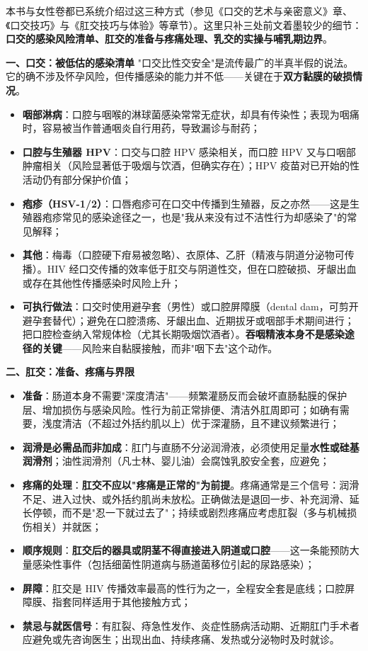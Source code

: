 \documentclass[12pt,UTF8]{ctexbook}
\begin{document}
本书与女性卷都已系统介绍过这三种方式（参见《口交的艺术与亲密意义》章、《口交技巧》与《肛交技巧与体验》等章节）。这里只补三处前文着墨较少的细节：\textbf{口交的感染风险清单、肛交的准备与疼痛处理、乳交的实操与哺乳期边界}。

\textbf{一、口交：被低估的感染清单}
"口交比性交安全"是流传最广的半真半假的说法。它的确不涉及怀孕风险，但传播感染的能力并不低——关键在于\textbf{双方黏膜的破损情况}。
\begin{itemize}
	\item \textbf{咽部淋病}：口腔与咽喉的淋球菌感染常常无症状，却具有传染性；表现为咽痛时，容易被当作普通咽炎自行用药，导致漏诊与耐药；
	\item \textbf{口腔与生殖器 HPV}：口交与口腔 HPV 感染相关，而口腔 HPV 又与口咽部肿瘤相关（风险显著低于吸烟与饮酒，但确实存在）；HPV 疫苗对已开始的性活动仍有部分保护价值；
	\item \textbf{疱疹（HSV-1/2）}：口唇疱疹可在口交中传播到生殖器，反之亦然——这是生殖器疱疹常见的感染途径之一，也是"我从来没有过不洁性行为却感染了"的常见解释；
	\item \textbf{其他}：梅毒（口腔硬下疳易被忽略）、衣原体、乙肝（精液与阴道分泌物可传播）。HIV 经口交传播的效率低于肛交与阴道性交，但在口腔破损、牙龈出血或存在其他性传播感染时风险上升；
	\item \textbf{可执行做法}：口交时使用避孕套（男性）或口腔屏障膜（dental dam，可剪开避孕套替代）；避免在口腔溃疡、牙龈出血、近期拔牙或咽部手术期间进行；把口腔检查纳入常规体检（尤其长期吸烟饮酒者）。\textbf{吞咽精液本身不是感染途径的关键}——风险来自黏膜接触，而非"咽下去"这个动作。
\end{itemize}

\textbf{二、肛交：准备、疼痛与界限}
\begin{itemize}
	\item \textbf{准备}：肠道本身不需要"深度清洁"——频繁灌肠反而会破坏直肠黏膜的保护层、增加损伤与感染风险。性行为前正常排便、清洁外肛周即可；如确有需要，浅度清洁（不超过外括约肌以上）优于深灌肠，且不建议频繁进行；
	\item \textbf{润滑是必需品而非加成}：肛门与直肠不分泌润滑液，必须使用足量\textbf{水性或硅基润滑剂}；油性润滑剂（凡士林、婴儿油）会腐蚀乳胶安全套，应避免；
	\item \textbf{疼痛的处理}：\textbf{肛交不应以"疼痛是正常的"为前提}。疼痛通常是三个信号：润滑不足、进入过快、或外括约肌尚未放松。正确做法是退回一步、补充润滑、延长停顿，而不是"忍一下就过去了"；持续或剧烈疼痛应考虑肛裂（多与机械损伤相关）并就医；
	\item \textbf{顺序规则}：\textbf{肛交后的器具或阴茎不得直接进入阴道或口腔}——这一条能预防大量感染性事件（包括细菌性阴道病与肠道菌移位引起的尿路感染）；
	\item \textbf{屏障}：肛交是 HIV 传播效率最高的性行为之一，全程安全套是底线；口腔屏障膜、指套同样适用于其他接触方式；
	\item \textbf{禁忌与就医信号}：有肛裂、痔急性发作、炎症性肠病活动期、近期肛门手术者应避免或先咨询医生；出现出血、持续疼痛、发热或分泌物时及时就诊。
\end{itemize}
\end{document}
